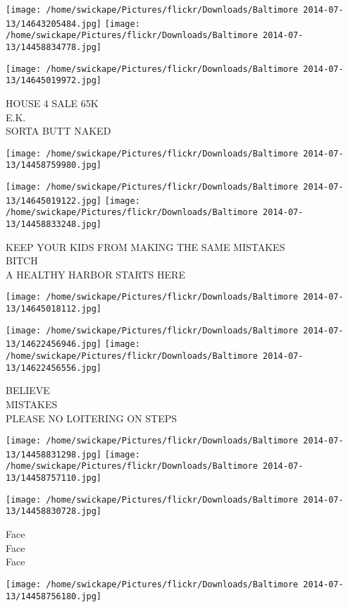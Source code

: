 \documentclass[10pt,letterpaper]{article}
\begin{document}
\texttt{[image: /home/swickape/Pictures/flickr/Downloads/Baltimore 2014-07-13/14643205484.jpg]}
\texttt{[image: /home/swickape/Pictures/flickr/Downloads/Baltimore 2014-07-13/14458834778.jpg]}

\texttt{[image: /home/swickape/Pictures/flickr/Downloads/Baltimore 2014-07-13/14645019972.jpg]}

HOUSE 4 SALE 65K\\
E.K.\\
SORTA BUTT NAKED
\pagebreak

\texttt{[image: /home/swickape/Pictures/flickr/Downloads/Baltimore 2014-07-13/14458759980.jpg]}

\vspace{0.25in}
\texttt{[image: /home/swickape/Pictures/flickr/Downloads/Baltimore 2014-07-13/14645019122.jpg]}
\texttt{[image: /home/swickape/Pictures/flickr/Downloads/Baltimore 2014-07-13/14458833248.jpg]}

KEEP YOUR KIDS FROM MAKING THE SAME MISTAKES\\
BITCH\\
A HEALTHY HARBOR STARTS HERE
\pagebreak

\texttt{[image: /home/swickape/Pictures/flickr/Downloads/Baltimore 2014-07-13/14645018112.jpg]}

\vspace{0.25in}
\texttt{[image: /home/swickape/Pictures/flickr/Downloads/Baltimore 2014-07-13/14622456946.jpg]}
\texttt{[image: /home/swickape/Pictures/flickr/Downloads/Baltimore 2014-07-13/14622456556.jpg]}

BELIEVE\\
MISTAKES\\
PLEASE NO LOITERING ON STEPS
\pagebreak

\texttt{[image: /home/swickape/Pictures/flickr/Downloads/Baltimore 2014-07-13/14458831298.jpg]}
\texttt{[image: /home/swickape/Pictures/flickr/Downloads/Baltimore 2014-07-13/14458757110.jpg]}

\texttt{[image: /home/swickape/Pictures/flickr/Downloads/Baltimore 2014-07-13/14458830728.jpg]}

Face\\
Face\\
Face
\pagebreak

\texttt{[image: /home/swickape/Pictures/flickr/Downloads/Baltimore 2014-07-13/14458756180.jpg]}
\end{document}
